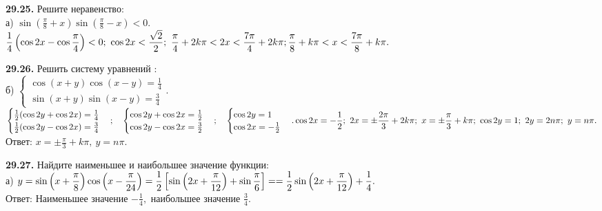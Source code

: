 \documentclass[a5paper,10pt]{article}
\begin{document}
\medskip
\noindent
{\bf 29.25.} Решите неравенство:\\[3pt]
а) $\displaystyle \sin\left(\frac{\pi}{8}+
x\right)\sin\left(\frac{\pi}{8}-x\right)<0.$\\
$\displaystyle \frac14\left(\cos2x-\cos\frac{\pi}{4}\right)<0;
\ \cos2x<\frac{\sqrt2}{2};\ \frac{\pi}{4}+2k\pi<2x<\frac{7\pi}{4}+2k\pi;\\[3pt]
\frac{\pi}{8}+k\pi<x<\frac{7\pi}{8}+k\pi.$


\medskip
\noindent
{\bf 29.26.} Решить систему уравнений :\\[3pt]
б) $\displaystyle \begin{cases}\cos(x+y)\cos(x-y)=\frac14\\
\sin(x+y)\sin(x-y)=\frac34\end{cases}.$\\[3pt]
$\displaystyle \begin{cases}\frac12(\cos2y+\cos2x)=\frac14\\
\frac12(\cos2y-\cos2x)=\frac34\end{cases};\quad
\begin{cases}\cos2y+\cos2x=\frac12\\
\cos2y-\cos2x=\frac32\end{cases};\quad
\begin{cases}\cos2y=1\\ \cos2x=-\frac12\end{cases}.\\[3pt]
\cos2x=-\frac12;\ 2x=\pm\frac{2\pi}{3}+2k\pi;\ x=\pm\frac{\pi}{3}+k\pi;\ \cos2y=1;\ 2y=2n\pi;\ y=n\pi.$\\
Ответ: $\displaystyle x=\pm\frac{\pi}{3}+k\pi,\ y=n\pi.$

\medskip
\noindent
{\bf 29.27.} Найдите наименьшее и наибольшее значение функции:\\[3pt]
а) $\displaystyle y=\sin\left(x+\frac{\pi}{8}\right)
\cos\left(x-\frac{\pi}{24}\right)=
\frac12\left[\sin\left(2x+\frac{\pi}{12}\right)+\sin\frac{\pi}{6}\right]=\\[3pt]
=\frac12\sin\left(2x+\frac{\pi}{12}\right)+\frac14.$\\[3pt]
Ответ: Наименьшее значение $\displaystyle -\frac14,$
наибольшее значение $\displaystyle \frac34.$

\bigskip
{}
\end{document}
